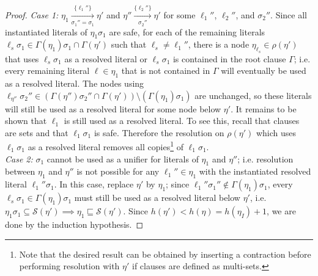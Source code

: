 \documentclass{llncs}
\begin{document}
\begin{proof}
\noindent
\emph{Case 1:}  $\eta_1 \xrightarrow[\sigma_1''=\sigma_1]{\{\ell_1''\} } \eta'$ and $\eta'' \xrightarrow[\sigma_2'']{\{\ell_2''\} } \eta'$ for some $\ell_1''$, $\ell_2''$, and $\sigma_2''$.
Since all instantiated literals of $\eta_1\sigma_1$ are safe, for each of the remaining literals $\ell_s \sigma_1 \in \Gamma(\eta_1)\sigma_1 \cap \Gamma(\eta')$ such that $\ell_s\neq \ell_1''$, there is a node $\eta_{\ell_s}\in \rho(\eta')$ that uses $\ell_s\sigma_1$ as a resolved literal or $\ell_s\sigma_1$ is contained in the root clause $\Gamma$; i.e. every remaining literal $\ell \in \eta_1$ that is not contained in $\Gamma$ will eventually be used as a resolved literal. The nodes using $\ell_{\eta''}\sigma_2'' \in (\Gamma(\eta'')\sigma_2''\cap\Gamma(\eta'))\setminus (\Gamma(\eta_1)\sigma_1)$ are unchanged, so these literals will still be used as a resolved literal for some node below $\eta'$. 
It remains to be shown that $\ell_1$ is still used as a resolved literal. To see this, recall that clauses are sets and that $\ell_1\sigma_1$ is safe. Therefore the resolution on $\rho(\eta')$ which uses $\ell_1\sigma_1$ as a resolved literal removes all copies\footnote{Note that the desired result can be obtained by inserting a contraction before performing resolution with $\eta'$ if clauses are defined as multi-sets.} of $\ell_1\sigma_1$. \\

\noindent
\emph{Case 2:} $\sigma_1$ cannot be used as a unifier for literals of $\eta_1$ and $\eta''$; i.e. resolution between $\eta_1$ and $\eta''$ is not possible for any $\ell_1''\in \eta_1$ %
with the instantiated resolved literal $\ell_1''\sigma_1$. In this case, replace $\eta'$ by $\eta_1$; since $\ell_1''\sigma_1'' \notin \Gamma(\eta_1)\sigma_1$, every $\ell_s\sigma_1 \in \Gamma(\eta_1)\sigma_1$ must still be used as a resolved literal below $\eta'$, i.e. $\eta_1\sigma_1 \subseteq \mathcal{S}(\eta') \implies \eta_1 \sqsubseteq \mathcal{S}(\eta')$. Since $h(\eta') < h(\eta)=h(\eta_I)+1$, we are done by the induction hypothesis. 


\end{proof}
\end{document}
